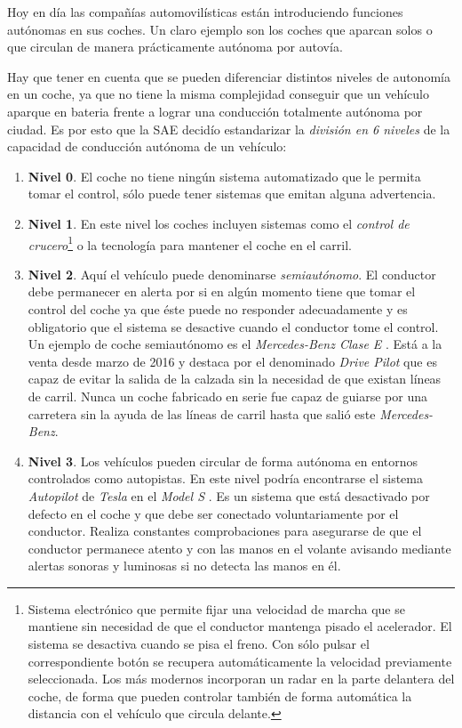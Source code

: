 Hoy en día las compañías automovilísticas están introduciendo funciones autónomas en sus coches. Un claro ejemplo son los coches que aparcan solos o que circulan de manera prácticamente autónoma por autovía. 

Hay que tener en cuenta que se pueden diferenciar distintos niveles de autonomía en un coche, ya que no tiene la misma complejidad conseguir que un vehículo aparque en bateria frente a lograr una conducción totalmente autónoma por ciudad. Es por esto que la \ac{SAE} \cite{SAE} decidío estandarizar la \emph{división en 6 niveles} \cite{SAEstandard} de la capacidad de conducción autónoma de un vehículo:

\begin{enumerate}
\item \textbf{Nivel 0}. El coche no tiene ningún sistema automatizado que le permita tomar el control, sólo puede tener sistemas que emitan alguna advertencia.
\item \textbf{Nivel 1}. En este nivel los coches incluyen sistemas como el \emph{control de crucero}\footnote{Sistema electrónico que permite fijar una velocidad de marcha que se mantiene sin necesidad de que el conductor mantenga pisado el acelerador. El sistema se desactiva cuando se pisa el freno. Con sólo pulsar el correspondiente botón se recupera automáticamente la velocidad previamente seleccionada. Los más modernos incorporan un radar en la parte delantera del coche, de forma que pueden controlar también de forma automática la distancia con el vehículo que circula delante.} o la tecnología para mantener el coche en el carril.
\item \textbf{Nivel 2}. Aquí el vehículo puede denominarse \emph{semiautónomo}. El conductor debe permanecer en alerta por si en algún momento tiene que tomar el control del coche ya que éste puede no responder adecuadamente y es obligatorio que el sistema se desactive cuando el conductor tome el control. Un ejemplo de coche semiautónomo es el \textit{Mercedes-Benz Clase E} \cite{Mercedes}. Está a la venta desde marzo de 2016 y destaca por el denominado \emph{Drive Pilot} que es capaz de evitar la salida de la calzada sin la necesidad de que existan líneas de carril. Nunca un coche fabricado en serie fue capaz de guiarse por una carretera sin la ayuda de las líneas de carril hasta que salió este \textit{Mercedes-Benz}.
\item \textbf{Nivel 3}. Los vehículos pueden circular de forma autónoma en entornos controlados como autopistas. En este nivel podría encontrarse el sistema \emph{Autopilot} de \textit{Tesla} en el \textit{Model S} \cite{Tesla}. Es un sistema que está desactivado por defecto en el coche y que debe ser conectado voluntariamente por el conductor. Realiza constantes comprobaciones para asegurarse de que el conductor permanece atento y con las manos en el volante avisando mediante alertas sonoras y luminosas si no detecta las manos en él.

\end{enumerate}
